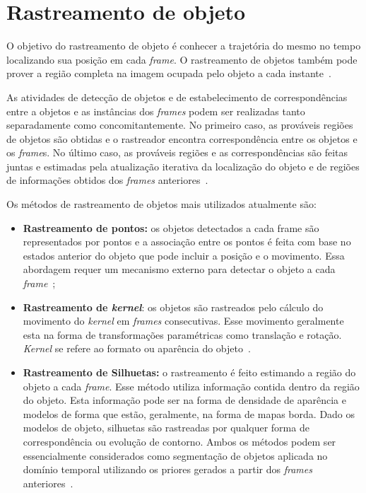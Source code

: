 \section{Rastreamento de objeto}

	O objetivo do rastreamento de objeto é conhecer a trajetória do mesmo no tempo localizando sua posição em cada \textit{frame}. O rastreamento de objetos também pode prover a região completa na imagem ocupada pelo objeto a cada instante~\cite{yilmaz}. 

	As atividades de detecção de objetos e de estabelecimento de correspondências entre a objetos e as instâncias dos \textit{frames} podem ser realizadas tanto separadamente como concomitantemente. No primeiro caso, as prováveis regiões de objetos são obtidas e o rastreador encontra correspondência entre os objetos e os \textit{frame}s. No último caso, as prováveis regiões e as correspondências são feitas juntas e estimadas pela atualização iterativa da localização do objeto e de regiões de informações obtidos dos \textit{frames} anteriores~\cite{yilmaz}.

	Os métodos de rastreamento de objetos mais utilizados atualmente são:

	\begin{itemize}
		\item \textbf{Rastreamento de pontos:} os objetos detectados a cada frame são representados por pontos e a associação entre os pontos é feita com base no estados anterior do objeto que pode incluir a posição e o movimento. Essa abordagem requer um mecanismo externo para detectar o objeto a cada \textit{frame}~\cite{yilmaz};

		\item \textbf{Rastreamento de \textit{kernel}}: os objetos são rastreados pelo cálculo do movimento do \textit{kernel} em \textit{frames} consecutivas. Esse movimento geralmente esta na forma de transformações paramétricas como translação e rotação. \textit{Kernel} se refere ao formato ou aparência do objeto~\cite{yilmaz}.

		\item \textbf{Rastreamento de Silhuetas:} o rastreamento é feito estimando a região do objeto a cada \textit{frame}. Esse método utiliza informação contida dentro da região do objeto. Esta informação pode ser na forma de densidade de aparência e modelos de forma que estão, geralmente, na forma de mapas borda. Dado os modelos de objeto, silhuetas são rastreadas por qualquer forma de correspondência ou evolução de contorno. Ambos os métodos podem ser essencialmente considerados como segmentação de objetos aplicada no domínio temporal utilizando os priores gerados a partir dos \textit{frames} anteriores~\cite{yilmaz}.
	\end{itemize}



